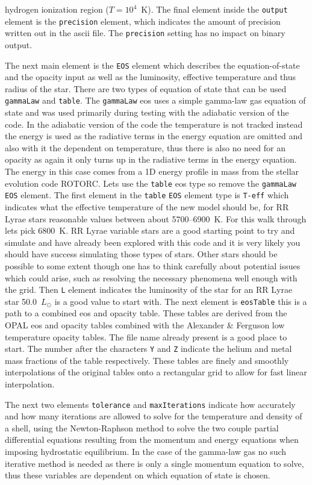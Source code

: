 \documentclass[12pt,a4paper]{book}
\begin{document}
hydrogen ionization region ($T=10^4$~K). The final element inside the {\tt output} element is the {\tt precision} element, which indicates the amount of precision written out in the ascii file. The {\tt precision} setting has no impact on binary output.

The next main element is the {\tt EOS} element which describes the equation-of-state and the opacity input as well as the luminosity, effective temperature and thus radius of the star. There are two types of equation of state that can be used {\tt gammaLaw} and {\tt table}. The {\tt gammaLaw} eos uses a simple gamma-law gas equation of state and was used primarily during testing with the adiabatic version of the code. In the adiabatic version of the code the temperature is not tracked instead the energy is used as the radiative terms in the energy equation are omitted and also with it the dependent on temperature, thus there is also no need for an opacity as again it only turns up in the radiative terms in the energy equation. The energy in this case comes from a 1D energy profile in mass from the stellar evolution code ROTORC. Lets use the {\tt table} eos type so remove the {\tt gammaLaw} {\tt EOS} element. The first element in the {\tt table} {\tt EOS} element type is {\tt T-eff} which indicates what the effective temperature of the new model should be, for RR Lyrae stars reasonable values between about 5700--6900~K. For this walk through lets pick 6800~K. RR Lyrae variable stars are a good starting point to try and simulate and have already been explored with this code and it is very likely you should have success simulating those types of stars. Other stars should be possible to some extent though one has to think carefully about potential issues which could arise, such as resolving the necessary phenomena well enough with the grid. Then {\tt L} element indicates the luminosity of the star for an RR Lyrae star 50.0~$L_\odot$ is a good value to start with. The next element is {\tt eosTable} this is a path to a combined eos and opacity table. These tables are derived from the OPAL eos and opacity tables combined with the Alexander \& Ferguson low temperature opacity tables. The file name already present is a good place to start. The number after the characters {\tt Y} and {\tt Z} indicate the helium and metal mass fractions of the table respectively. These tables are finely and smoothly interpolations of the original tables onto a rectangular grid to allow for fast linear interpolation. 

The next two elements {\tt tolerance} and {\tt maxIterations} indicate how accurately and how many iterations are allowed to solve for the temperature and density of a shell, using the Newton-Raphson method to solve the two couple partial differential equations resulting from the momentum and energy equations when imposing hydrostatic equilibrium. In the case of the gamma-law gas no such iterative method is needed as there is only a single momentum equation to solve, thus these variables are dependent on which equation of state is chosen.
\end{document}
